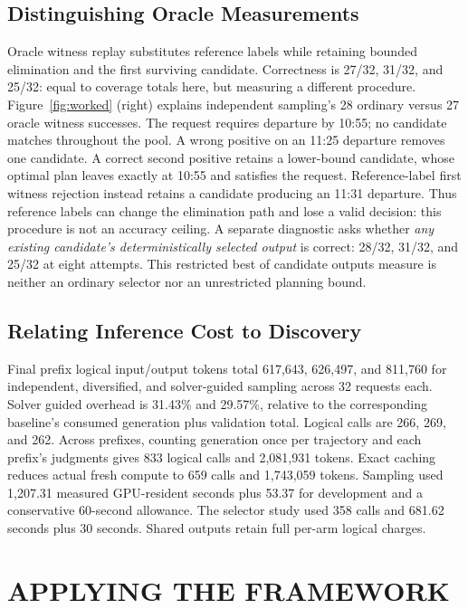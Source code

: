 \documentclass[a4paper,twoside]{article}
\begin{document}
\subsection{Distinguishing Oracle Measurements}

Oracle witness replay substitutes reference labels while retaining bounded elimination and the first surviving candidate. Correctness is 27/32, 31/32, and 25/32: equal to coverage totals here, but measuring a different procedure.
Figure~\ref{fig:worked} (right) explains independent sampling's 28 ordinary versus 27 oracle witness successes. The request requires departure by 10:55; no candidate matches throughout the pool. A wrong positive on an 11:25 departure removes one candidate. A correct second positive retains a lower-bound candidate, whose optimal plan leaves exactly at 10:55 and satisfies the request. Reference-label first witness rejection instead retains a candidate producing an 11:31 departure. Thus reference labels can change the elimination path and lose a valid decision: this procedure is not an accuracy ceiling.
A separate diagnostic asks whether \emph{any existing candidate's deterministically selected output} is correct: 28/32, 31/32, and 25/32 at eight attempts. This restricted best of candidate outputs measure is neither an ordinary selector nor an unrestricted planning bound. 

\subsection{Relating Inference Cost to Discovery}

Final prefix logical input/output tokens total 617,643, 626,497, and 811,760 for independent, diversified, and solver-guided sampling across 32 requests each. Solver guided overhead is 31.43\% and 29.57\%, relative to the corresponding baseline's consumed generation plus validation total. Logical calls are 266, 269, and 262. 
Across prefixes, counting generation once per trajectory and each prefix's judgments gives 833 logical calls and 2,081,931 tokens. Exact caching reduces actual fresh compute to 659 calls and 1,743,059 tokens. Sampling used 1,207.31 measured GPU-resident seconds plus 53.37 for development and a conservative 60-second allowance. The selector study used 358 calls and 681.62 seconds plus 30 seconds. Shared outputs retain full per-arm logical charges.



\section{\uppercase{Applying the Framework}}
\label{sec:recommendations}
\end{document}
